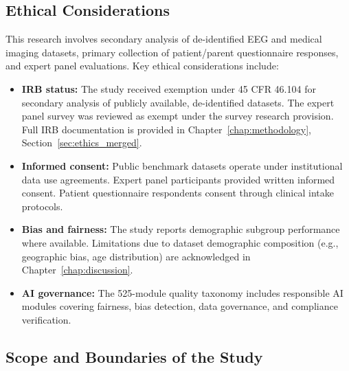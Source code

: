 \subsection{Ethical Considerations}
\label{sec:ethical_ch1}

This research involves secondary analysis of de-identified EEG and medical imaging datasets, primary collection of patient/parent questionnaire responses, and expert panel evaluations. Key ethical considerations include:

\begin{itemize}[leftmargin=*, itemsep=3pt]
    \item \textbf{IRB status:} The study received exemption under 45 CFR 46.104 for secondary analysis of publicly available, de-identified datasets. The expert panel survey was reviewed as exempt under the survey research provision. Full IRB documentation is provided in Chapter~\ref{chap:methodology}, Section~\ref{sec:ethics_merged}.
    \item \textbf{Informed consent:} Public benchmark datasets operate under institutional data use agreements. Expert panel participants provided written informed consent. Patient questionnaire respondents consent through clinical intake protocols.
    \item \textbf{Bias and fairness:} The study reports demographic subgroup performance where available. Limitations due to dataset demographic composition (e.g., geographic bias, age distribution) are acknowledged in Chapter~\ref{chap:discussion}.
    \item \textbf{AI governance:} The 525-module quality taxonomy includes responsible AI modules covering fairness, bias detection, data governance, and compliance verification.
\end{itemize}

\subsection{Scope and Boundaries of the Study}
\label{sec:scope_boundaries}

